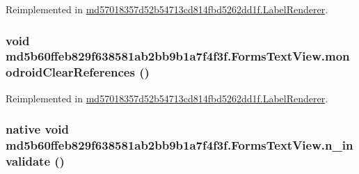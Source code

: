Reimplemented in \hyperlink{classmd57018357d52b54713cd814fbd5262dd1f_1_1_label_renderer_565940650659653853e6c97f4efb5f07}{md57018357d52b54713cd814fbd5262dd1f.LabelRenderer}.\hypertarget{classmd5b60ffeb829f638581ab2bb9b1a7f4f3f_1_1_forms_text_view_ae0338a9a14411e891317f37a37f4f58}{
\subsubsection[{monodroidClearReferences}]{\setlength{\rightskip}{0pt plus 5cm}void md5b60ffeb829f638581ab2bb9b1a7f4f3f.FormsTextView.monodroidClearReferences ()}}
\label{classmd5b60ffeb829f638581ab2bb9b1a7f4f3f_1_1_forms_text_view_ae0338a9a14411e891317f37a37f4f58}




Reimplemented in \hyperlink{classmd57018357d52b54713cd814fbd5262dd1f_1_1_label_renderer_d17a308f68c51092a4967293f970fbaa}{md57018357d52b54713cd814fbd5262dd1f.LabelRenderer}.\hypertarget{classmd5b60ffeb829f638581ab2bb9b1a7f4f3f_1_1_forms_text_view_89dfc7b60d01058537f74b9c0b254c12}{
\subsubsection[{n\_\-invalidate}]{\setlength{\rightskip}{0pt plus 5cm}native void md5b60ffeb829f638581ab2bb9b1a7f4f3f.FormsTextView.n\_\-invalidate ()}}
\label{classmd5b60ffeb829f638581ab2bb9b1a7f4f3f_1_1_forms_text_view_89dfc7b60d01058537f74b9c0b254c12}




